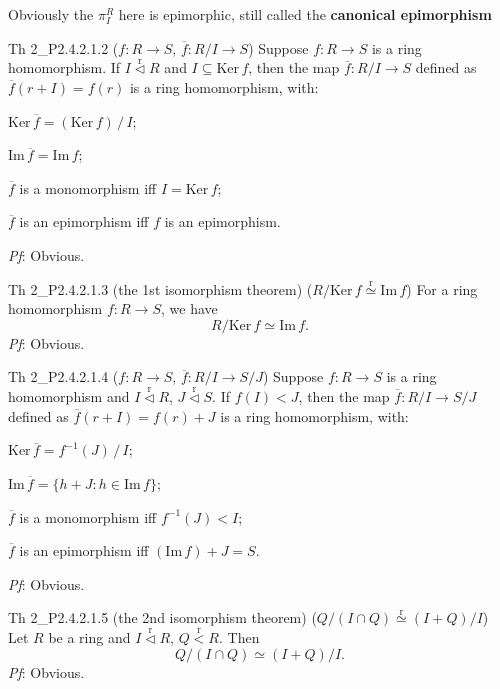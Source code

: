 \documentclass{article}
\newcommand{\nles}{\vartriangleleft}
\newcommand{\Ker}{\text{Ker}\,}
\newcommand{\Ima}{\text{Im}\,}
\newcommand{\Riso}{\overset{\text{r}}{\simeq}} %
\newcommand{\subr}{\overset{\text{r}}{<}} %
\newcommand{\ideal}{\overset{\text{r}}{\nles}} %
\begin{document}
\begin{Rmk}{}
    \textcolor{Th}{Obviously the $\pi_I^R$ here is epimorphic,} \textcolor{Df}{still called the \textbf{canonical epimorphism}}
\end{Rmk}

\begin{Th}{Th 2\_P2.4.2.1.2 ($f: R\to S$, $\overline{f}: R/I\to S$)}
    Suppose $f: R\to S$ is a ring homomorphism. If $I\ideal R$ and $I\subseteq\Ker f$, then the map $\overline{f}: R/I\to S$ defined as $\overline{f}(r+I) = f(r)$ is a ring homomorphism, with:
    \begin{compactenum}
        \item $\Ker \overline{f} = (\Ker f)\,/\,I$;
        \item $\Ima \overline{f} = \Ima f$;
        \item $\overline{f}$ is a monomorphism iff $I = \Ker f$;
        \item $\overline{f}$ is an epimorphism iff $f$ is an epimorphism.
    \end{compactenum}
    \tcblower
    \textit{Pf}: Obvious.
\end{Th}

\begin{Th}{Th 2\_P2.4.2.1.3 (the 1st isomorphism theorem) ($R/\Ker f\Riso \Ima f$)}
    For a ring homomorphism $f: R\to S$, we have
    $$ R/\Ker f \simeq \Ima f. $$
    \tcblower
    \textit{Pf}: Obvious.
\end{Th}

\begin{Th}{Th 2\_P2.4.2.1.4 ($f: R\to S$, $\overline{f}: R/I\to S/J$)}
    Suppose $f: R\to S$ is a ring homomorphism and $I\ideal R$, $J\ideal S$. If $f(I)<J$, then the map $\overline{f}: R/I\to S/J$ defined as $\overline{f}(r+I) = f(r)+J$ is a ring homomorphism, with:
    \begin{compactenum}
        \item $\Ker \overline{f} = f^{-1}(J)\,/\,I$;
        \item $\Ima \overline{f} = \{h+J: h\in\Ima f\}$;
        \item $\overline{f}$ is a monomorphism iff $f^{-1}(J) < I$;
        \item $\overline{f}$ is an epimorphism iff $(\Ima f) + J = S$.
    \end{compactenum}
    \tcblower
    \textit{Pf}: Obvious.
\end{Th}

\begin{Th}{Th 2\_P2.4.2.1.5 (the 2nd isomorphism theorem) ($ Q/(I\cap Q) \Riso (I+Q)/I $)}
    Let $R$ be a ring and $I\ideal R$, $Q\subr R$. Then
    $$ Q/(I\cap Q) \simeq (I+Q)/I. $$
    \tcblower
    \textit{Pf}: Obvious.
\end{Th}
\end{document}
